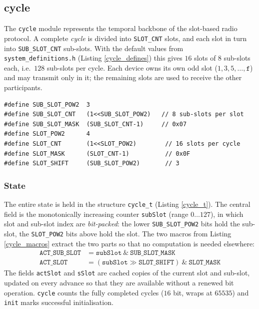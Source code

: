 \subsection{cycle}\label{cycle}
The \verb|cycle| module represents the temporal backbone of the slot-based
radio protocol. A complete \emph{cycle} is divided into \verb|SLOT_CNT| slots,
and each slot in turn into \verb|SUB_SLOT_CNT| sub-slots. With the default
values from \verb|system_definitions.h| (Listing \ref{cycle_defines}) this
gives $16$ slots of $8$ sub-slots each, i.e.\ $128$ sub-slots per cycle. Each
device owns its own odd slot ($1, 3, 5, \dots, \mathtt{f}$) and may transmit
only in it; the remaining slots are used to receive the other participants.

\begin{listing}
\begin{verbatim}
#define SUB_SLOT_POW2  3
#define SUB_SLOT_CNT   (1<<SUB_SLOT_POW2)   // 8 sub-slots per slot
#define SUB_SLOT_MASK  (SUB_SLOT_CNT-1)     // 0x07
#define SLOT_POW2      4
#define SLOT_CNT       (1<<SLOT_POW2)        // 16 slots per cycle
#define SLOT_MASK      (SLOT_CNT-1)          // 0x0F
#define SLOT_SHIFT     (SUB_SLOT_POW2)       // 3
\end{verbatim}
\caption{Slot constants from \texttt{system\_definitions.h}}
\label{cycle_defines}
\end{listing}

\subsubsection*{State}
The entire state is held in the structure \verb|cycle_t| (Listing
\ref{cycle_t}). The central field is the monotonically increasing counter
\verb|subSlot| (range $0 \dots 127$), in which slot and sub-slot index are
\emph{bit-packed}: the lower \verb|SUB_SLOT_POW2| bits hold the sub-slot, the
\verb|SLOT_POW2| bits above hold the slot. The two macros from Listing
\ref{cycle_macros} extract the two parts so that no computation is needed
elsewhere:
\begin{align*}
\mathtt{ACT\_SUB\_SLOT} &= \mathtt{subSlot}\ \&\ \mathtt{SUB\_SLOT\_MASK} \\
\mathtt{ACT\_SLOT}      &= (\mathtt{subSlot} \gg \mathtt{SLOT\_SHIFT})\ \&\ \mathtt{SLOT\_MASK}
\end{align*}
The fields \verb|actSlot| and \verb|sSlot| are cached copies of the current
slot and sub-slot, updated on every advance so that they are available without
a renewed bit operation. \verb|cycle| counts the fully completed cycles
($16$ bit, wraps at $65535$) and \verb|init| marks successful initialisation.

